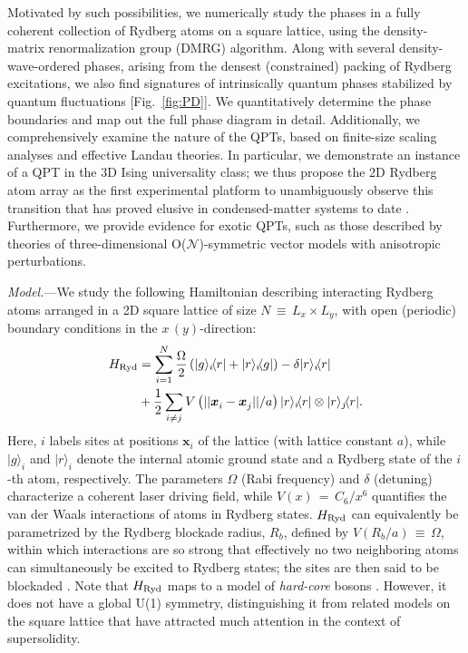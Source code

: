 \documentclass[prl,twocolumn,superscriptaddress,showpacs,amsmath,amstex,amssymb,citeautoscript]{revtex4-1}
\newcommand{\bra}[1]{\langle {#1} |}
\newcommand{\ket}[1]{| {#1} \rangle}
\newcommand{\vect}[1]{\boldsymbol{#1}}
\begin{document}
Motivated by such possibilities, %
we numerically study the phases in a fully coherent collection of Rydberg atoms on a square lattice, using the density-matrix renormalization group (DMRG) algorithm. Along with several density-wave-ordered 
phases, arising from the densest (constrained) packing of Rydberg excitations,
we also find signatures of %
intrinsically quantum phases 
stabilized by quantum fluctuations [Fig.~\ref{fig:PD}].  
%
We quantitatively determine the %
phase boundaries and %
map out the full phase diagram in detail.
Additionally, we comprehensively examine the nature of the QPTs, based on finite-size scaling analyses and effective Landau theories. In particular, we demonstrate an instance of a QPT in the 3D Ising universality class; we thus propose the 2D Rydberg atom array as the first experimental platform to unambiguously observe this transition that has proved elusive in condensed-matter systems to date \cite{coldea2014}. Furthermore, we provide evidence for exotic QPTs, such as those described by theories of three-dimensional O($\mathscr{N}$)-symmetric vector models with anisotropic perturbations.
 
 
 
 \emph{Model.}---We study the following Hamiltonian describing interacting Rydberg atoms arranged in a 2D square lattice of size $N$\,$\equiv$\,$L_x$\,$\times$\,$L_y$, with open (periodic) boundary conditions in the $x$\,$(y)$-direction:
\begin{alignat}{1}
\label{eq:Rydberg}
\nonumber H_{\rm Ryd}&=\sum_{i=1}^N \frac{\Omega}{2} \left(\ket{g}_i\!\bra{r}+\ket{r}_i\!\bra{g} \right)-\delta \ket{r}_i\!\bra{r} \\
&+ \frac{1}{2}\sum_{i\ne j} V\left(\lvert \lvert \vect{x}^{}_i-\vect{x}^{}_j \rvert  \rvert/a\right)\ket{r}_i\!\bra{r}\otimes \ket{r}_j\!\bra{r}.
\end{alignat}
Here, $i$ labels sites at positions $\vect{x}_{i}$ of the lattice (with lattice constant $a$), while $\ket{g}_i$ and $\ket{r}_i$ denote the internal atomic ground state and a Rydberg state of the $i$-th atom, respectively. The parameters $\Omega$ (Rabi frequency) and $\delta$ (detuning) characterize a coherent laser driving field, while $V(x)$\,$=$\,$C_6/x^6$ quantifies the van der Waals interactions of atoms in Rydberg states. 
$H_{\rm Ryd}$ can equivalently be parametrized by the Rydberg blockade radius, $R_b$, defined by $V (R_b/a)$\,$\equiv$\,$\Omega$, within which interactions are so strong that effectively no two neighboring atoms can simultaneously be excited to Rydberg states; the sites are then said to be blockaded \cite{jaksch2000fast}. 
Note that $H_{\rm Ryd}$ maps to a model of \textit{hard-core} bosons \cite{sachdev2002mott,fendley2004competing}. However, it does not have a global U(1) symmetry, distinguishing it from related models \cite{hebert2001quantum, yamamoto2012quantum, xiao2015hard} on the square lattice that have attracted much attention in the context of supersolidity.
\end{document}
